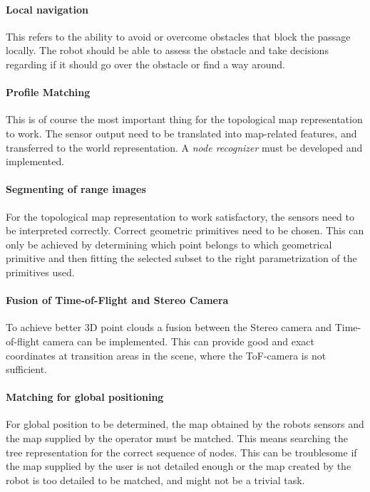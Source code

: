 \paragraph{Local navigation} This refers to the ability to avoid or overcome obstacles
that block the passage locally. The robot should be able to assess the obstacle and take
decisions regarding if it should go over the obstacle or find a way around. 

\paragraph{Profile Matching} This is of course the most important thing for the
topological map representation to work. The sensor output need to be translated into 
map-related features, and transferred to the world representation. A \emph{node recognizer}
must be developed and implemented.

\paragraph{Segmenting of range images} For the topological map representation to work
satisfactory, the sensors need to be interpreted correctly. Correct geometric primitives 
need to be chosen.  This can only be achieved by determining which point belongs to which 
geometrical primitive and then fitting the selected subset to the right parametrization of the 
primitives used. 

\paragraph{Fusion of Time-of-Flight and Stereo Camera} To achieve better 3D point clouds
a fusion between the Stereo camera and Time-of-flight camera can be implemented. This can
provide good and exact coordinates at transition areas in the scene, where the ToF-camera
is not sufficient. 


\paragraph{Matching for global positioning} For global position to be determined, the map
obtained by the robots sensors and the map supplied by the operator must be matched. This
means searching the tree representation for the correct sequence of nodes. This
can be troublesome if the map supplied by the user is not detailed enough or the map
created by the robot is too detailed to be matched, and might not be a trivial task. 

